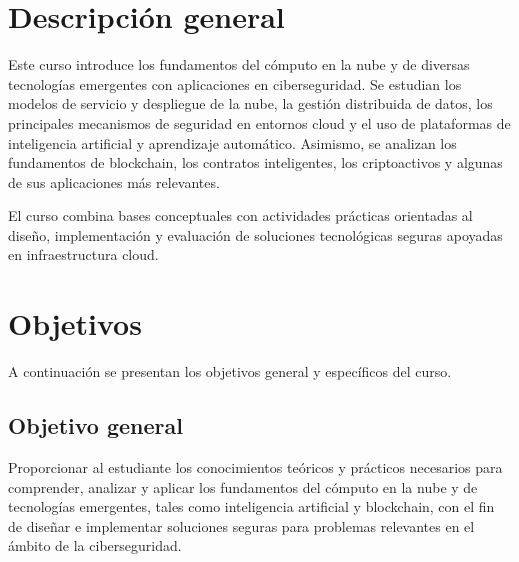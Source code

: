 \documentclass[
  coursetitle={Cómputo Nube y Tecnologías Emergentes},
  coursehours={96},
  coursedate={Verano 2026},
  doctype={Guía del curso},
  otherlangs={english,french},
  authorname={Lázaro},
  authorsurname={Bustio-Martínez},
  authortitle={PhD},
  role={Profesor Investigador},
  email={lbustio@inaoe.mx},
  phone={5559504000},
  ext={7459},
  institution={Instituto Nacional de Astrofísica, Óptica y Electrónica (INAOE)},
  department={Maestría en Ciencias en Tecnologías de Seguridad},
  address={Luis Enrique Erro 1, Sta. Ma. Tonantzintla, San Andrés Cholula, CP 72840, Puebla, México},
  margin={0.5in}
]{../../lbustio_lecture_notes}
\begin{document}
\IberoCover

\section{Descripción general}
\label{sec:descripcion}

Este curso introduce los fundamentos del cómputo en la nube y de diversas tecnologías emergentes con aplicaciones en ciberseguridad. Se estudian los modelos de servicio y despliegue de la nube, la gestión distribuida de datos, los principales mecanismos de seguridad en entornos cloud y el uso de plataformas de inteligencia artificial y aprendizaje automático. Asimismo, se analizan los fundamentos de blockchain, los contratos inteligentes, los criptoactivos y algunas de sus aplicaciones más relevantes.

El curso combina bases conceptuales con actividades prácticas orientadas al diseño, implementación y evaluación de soluciones tecnológicas seguras apoyadas en infraestructura cloud.

\section{Objetivos}
\label{sec:objetivos}

A continuación se presentan los objetivos general y específicos del curso.

\subsection{Objetivo general}
\label{sec:objetivo_general}

Proporcionar al estudiante los conocimientos teóricos y prácticos necesarios para comprender, analizar y aplicar los fundamentos del cómputo en la nube y de tecnologías emergentes, tales como inteligencia artificial y blockchain, con el fin de diseñar e implementar soluciones seguras para problemas relevantes en el ámbito de la ciberseguridad.
\end{document}
